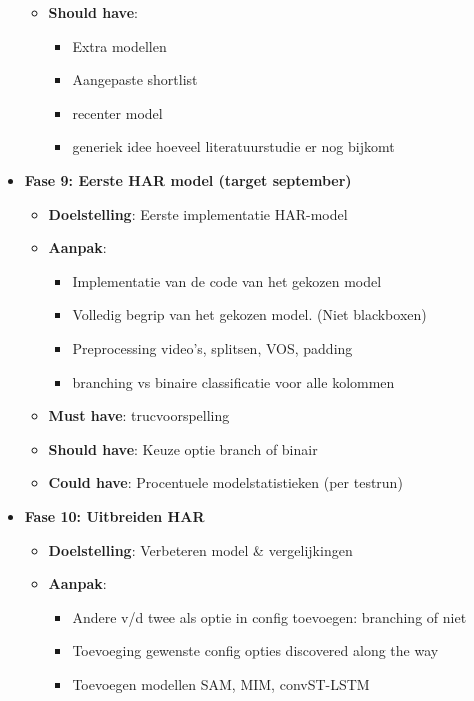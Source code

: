 \begin{itemize}
\begin{itemize}
        \item \textbf{Should have}:
        \begin{itemize}
            \item Extra modellen
            \item Aangepaste shortlist
            \item recenter model
            \item generiek idee hoeveel literatuurstudie er nog bijkomt
        \end{itemize}
    \end{itemize}
    \item \textbf{Fase 9: Eerste HAR model (target september)}
    \begin{itemize}
        \item \textbf{Doelstelling}: Eerste implementatie HAR-model
        \item \textbf{Aanpak}:
        \begin{itemize}
            \item Implementatie van de code van het gekozen model
            \item Volledig begrip van het gekozen model. (Niet blackboxen)
            \item Preprocessing video's, splitsen, VOS, padding
            \item branching vs binaire classificatie voor alle kolommen
        \end{itemize}
        \item \textbf{Must have}: trucvoorspelling
        \item \textbf{Should have}: Keuze optie branch of binair
        \item \textbf{Could have}: Procentuele modelstatistieken (per testrun)
    \end{itemize}
    \item \textbf{Fase 10: Uitbreiden HAR}
    \begin{itemize}
        \item \textbf{Doelstelling}: Verbeteren model \& vergelijkingen
        \item \textbf{Aanpak}:
        \begin{itemize}
            \item Andere v/d twee als optie in config toevoegen: branching of niet
            \item Toevoeging gewenste config opties discovered along the way
            \item Toevoegen modellen SAM, MIM, convST-LSTM

\end{itemize}
\end{itemize}
\end{itemize}
